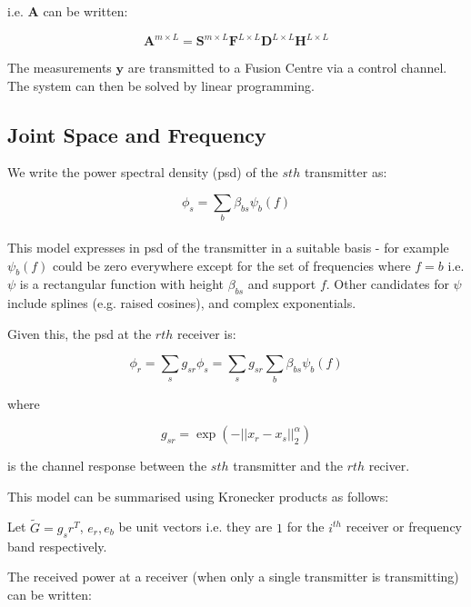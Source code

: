 \documentclass{article}
\begin{document}
i.e. \(\textbf{A}\) can be written: 

\begin{equation}
\textbf{A}^{m\times L} = \textbf{S}^{m\times L} \textbf{F}^{L\times L} \textbf{D}^{L \times L} \textbf{H}^{L \times L}
\label{system}
\end{equation}

The measurements \(\textbf{y}\) are transmitted to a Fusion Centre via a control channel. The system can then be solved by linear programming.

\subsection{Joint Space and Frequency}
We write the power spectral density (psd) of the \(sth\) transmitter as:

\begin{equation}
\phi_s = \sum_b \beta_{bs} \psi_b\left(f\right)
\label{basis_expansion}
\end{equation}
\\ 

This model expresses in psd of the transmitter in a suitable basis - for example \(\psi_b\left(f\right)\) could be zero everywhere except for the set of frequencies where \(f=b\) i.e. \(\psi\) is a rectangular function with height \(\beta_{bs}\) and support \(f\). Other candidates for \(\psi\) include splines (e.g. raised cosines), and complex exponentials. 

Given this, the psd at the \(rth\) receiver is:

\begin{equation}
\phi_r = \sum_s g_{sr}\phi_s = \sum_s g_{sr} \sum _b \beta_{bs}\psi_b\left(f\right)
\end{equation}

where

\begin{equation}
g_{sr} = \exp\left(-||x_r - x_s||_2^\alpha\right)
\end{equation}

is the channel response between the \(sth\) transmitter and the \(rth\) reciver.

This model can be summarised using Kronecker products as follows:

Let \(\tilde{G} = g_sr^T\), \(e_r, e_b\) be unit vectors i.e. they are \(1\) for the \(i^{th}\) receiver or frequency band respectively.

The received power at a receiver (when only a single transmitter is transmitting) can be written:
\end{document}
